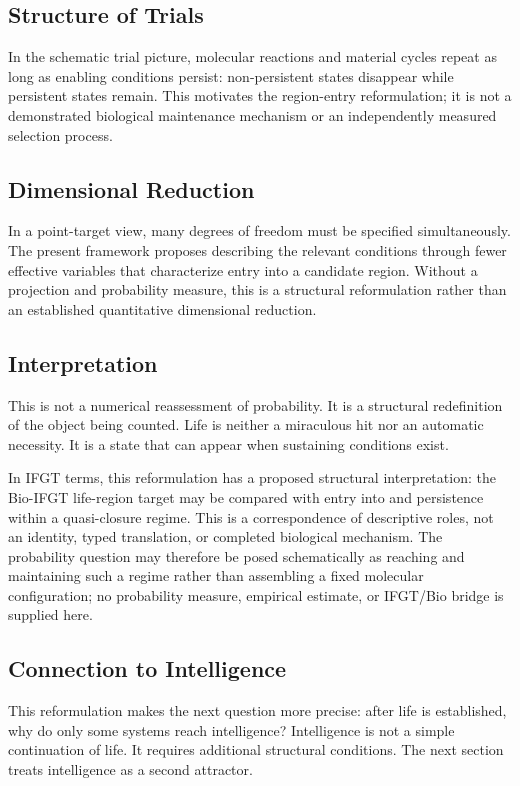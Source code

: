 \subsection{Structure of Trials}

In the schematic trial picture, molecular reactions and material cycles repeat as long as enabling conditions persist: non-persistent states disappear while persistent states remain. This motivates the region-entry reformulation; it is not a demonstrated biological maintenance mechanism or an independently measured selection process.

\subsection{Dimensional Reduction}

In a point-target view, many degrees of freedom must be specified simultaneously. The present framework proposes describing the relevant conditions through fewer effective variables that characterize entry into a candidate region. Without a projection and probability measure, this is a structural reformulation rather than an established quantitative dimensional reduction.

\subsection{Interpretation}

This is not a numerical reassessment of probability. It is a structural redefinition of the object being counted. Life is neither a miraculous hit nor an automatic necessity. It is a state that can appear when sustaining conditions exist.

In IFGT terms, this reformulation has a proposed structural interpretation: the Bio-IFGT life-region target may be compared with entry into and persistence within a quasi-closure regime. This is a correspondence of descriptive roles, not an identity, typed translation, or completed biological mechanism. The probability question may therefore be posed schematically as reaching and maintaining such a regime rather than assembling a fixed molecular configuration; no probability measure, empirical estimate, or IFGT/Bio bridge is supplied here.

\subsection{Connection to Intelligence}

This reformulation makes the next question more precise: after life is established, why do only some systems reach intelligence? Intelligence is not a simple continuation of life. It requires additional structural conditions. The next section treats intelligence as a second attractor.
